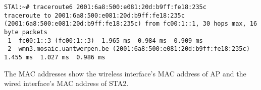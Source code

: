 \begin{lstlisting}
STA1:~# traceroute6 2001:6a8:500:e081:20d:b9ff:fe18:235c
traceroute to 2001:6a8:500:e081:20d:b9ff:fe18:235c (2001:6a8:500:e081:20d:b9ff:fe18:235c) from fc00:1::1, 30 hops max, 16 byte packets
 1  fc00:1::3 (fc00:1::3)  1.965 ms  0.984 ms  0.909 ms
 2  wmn3.mosaic.uantwerpen.be (2001:6a8:500:e081:20d:b9ff:fe18:235c)  1.455 ms  1.027 ms  0.986 ms
\end{lstlisting}

 The MAC addresses show the wireless interface's MAC address of AP and the wired interface's MAC address of STA2.
